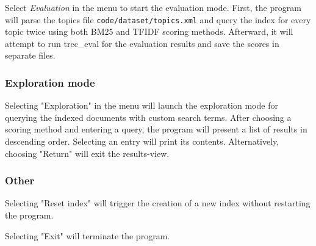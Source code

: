Select \textit{Evaluation} in the menu to start the evaluation mode.
First, the program will parse the topics file \verb|code/dataset/topics.xml| and query the index for every topic twice using both BM25 and TFIDF scoring methods.
Afterward, it will attempt to run trec\_eval for the evaluation results and save the scores in separate files.


\subsubsection{Exploration mode}

Selecting "Exploration" in the menu will launch the exploration mode for querying the indexed documents with custom search terms.
After choosing a scoring method and entering a query, the program will present a list of results in descending order.
Selecting an entry will print its contents.
Alternatively, choosing "Return" will exit the results-view.

\subsubsection{Other}

Selecting "Reset index" will trigger the creation of a new index without restarting the program.

Selecting "Exit" will terminate the program.
